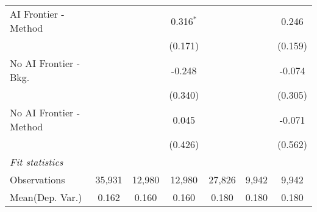 \begin{tabular}{lcccccc}
   AI Frontier - Method    &                &                & 0.316$^{*}$   &                &              & 0.246\\   
                           &                &                & (0.171)       &                &              & (0.159)\\   
   No AI Frontier - Bkg.   &                &                & -0.248        &                &              & -0.074\\   
                           &                &                & (0.340)       &                &              & (0.305)\\   
   No AI Frontier - Method &                &                & 0.045         &                &              & -0.071\\   
                           &                &                & (0.426)       &                &              & (0.562)\\   
   \midrule
   \emph{Fit statistics}\\
   Observations            & 35,931         & 12,980         & 12,980        & 27,826         & 9,942        & 9,942\\  
Mean(Dep. Var.) & 0.162 & 0.160 & 0.160 & 0.180 & 0.180 & 0.180 \\
   

\end{tabular}

